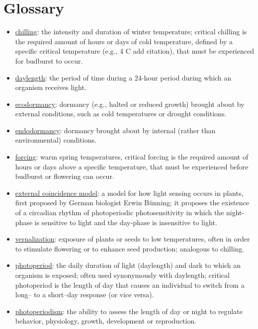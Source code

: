 \documentclass{article}
\begin{document}
\section* {Glossary}
\begin{itemize}
\item \underline{chilling}: the intensity and duration of winter temperature; critical chilling is the required amount of hours or days of cold temperature, defined by a specific critical temperature (e.g., 4 \degree C add citation), that must be experienced for budburst to occur.
\item \underline{daylength}: the period of time during a 24-hour period during which an organism receives light.
\item \underline{ecodormancy}: dormancy (e.g., halted or reduced growth) brought about by external conditions, such as cold temperatures or drought conditions. %
\item \underline{endodormancy}: dormancy brought about by internal (rather than environmental) conditions. 
\item \underline{forcing}: warm spring temperatures, critical forcing is the required amount of hours or days above a specific temperature, that must be experienced before budburst or flowering can occur.
\item \underline{external coincidence model}: a model for how light sensing occurs in plants, first proposed by German biologist Erwin Bünning; it proposes the existence of a circadian rhythm of photoperiodic photosensitivity in which the night-phase is sensitive to light and the day-phase is insensitive to light. 
\item \underline{vernalization}: exposure of plants or seeds to low temperatures, often in order to stimulate flowering or to enhance seed production; analogous to chilling.
\item \underline{photoperiod}: the daily duration of light (daylength) and dark to which an organism is exposed; often used synonymously with daylength; critical photoperiod is the length of day that causes an individual to switch from a long-- to a short--day response (or vice versa).
\item \underline{photoperiodism}: the ability to assess the length of day or night to regulate behavior, physiology, growth, development or reproduction.
\end{itemize}
\end{document}
